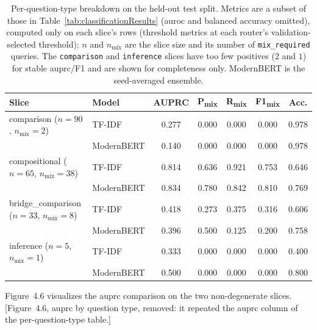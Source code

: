 \documentclass[english, bibtex]{kththesis}               %
\numberwithin{listing}{chapter}
\providecommand{\DIFdeltex}[1]{{\protect\color{red} \scriptsize #1}} %
\providecommand{\DIFdelbegin}{} %
\providecommand{\DIFdel}[1]{\texorpdfstring{\DIFdeltex{#1}}{}} %
\begin{document}
\begin{table}[!ht]
\centering
\small
\setlength{\tabcolsep}{5pt}
\renewcommand{\arraystretch}{1.1}
\caption[Per-question-type breakdown on the held-out test split]{Per-question-type breakdown on the held-out test split. Metrics are a subset of those in Table~\ref{tab:classificationResults} (\gls{auroc} and balanced accuracy omitted), computed only on each slice's rows (threshold metrics at each router's validation-selected threshold); $n$ and $n_{\text{mix}}$ are the slice size and its number of \texttt{mix\_required} queries. The \texttt{comparison} and \texttt{inference} slices have too few positives ($2$ and $1$) for stable \gls{auprc}/F1 and are shown for completeness only. ModernBERT is the seed-averaged ensemble.}
\label{tab:perQuestionType}
\begin{tabular}{l|l|ccccc}
\textbf{Slice} & \textbf{Model} & \textbf{AUPRC} & \textbf{P\textsubscript{mix}} & \textbf{R\textsubscript{mix}} & \textbf{F1\textsubscript{mix}} & \textbf{Acc.} \\
\hline
\makecell[l]{comparison\\($n = 90$, $n_{\text{mix}} = 2$)} & TF-IDF & 0.277 & 0.000 & 0.000 & 0.000 & 0.978 \\
 & ModernBERT & 0.140 & 0.000 & 0.000 & 0.000 & 0.978 \\
\hline
\makecell[l]{compositional\\($n = 65$, $n_{\text{mix}} = 38$)} & TF-IDF & 0.814 & 0.636 & 0.921 & 0.753 & 0.646 \\
 & ModernBERT & 0.834 & 0.780 & 0.842 & 0.810 & 0.769 \\
\hline
\makecell[l]{bridge\_comparison\\($n = 33$, $n_{\text{mix}} = 8$)} & TF-IDF & 0.418 & 0.273 & 0.375 & 0.316 & 0.606 \\
 & ModernBERT & 0.396 & 0.500 & 0.125 & 0.200 & 0.758 \\
\hline
\makecell[l]{inference\\($n = 5$, $n_{\text{mix}} = 1$)} & TF-IDF & 0.333 & 0.000 & 0.000 & 0.000 & 0.400 \\
 & ModernBERT & 0.500 & 0.000 & 0.000 & 0.000 & 0.800 \\
\end{tabular}
\end{table}


\DIFdelbegin \DIFdel{Figure~4.6 visualizes the \gls{auprc} comparison on the two non-degenerate slices. [Figure~4.6, \gls{auprc} by question type, removed: it repeated the \gls{auprc} column of the per-question-type table.]}
\end{document}
